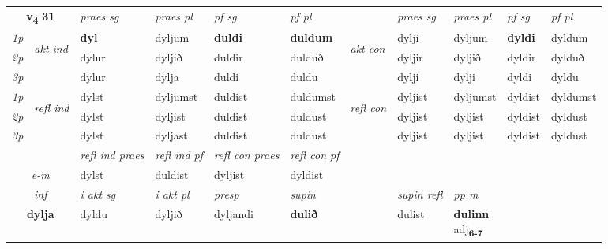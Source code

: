 \noindent
\begin{tabular}{lllllllllll} \toprule
\multicolumn{2}{c}{\textbf{v{\textsubscript{4}}} \Large{\textbf{31}}}  &  \textit{praes sg}  & \textit{praes pl}  &\textit{ pf sg} & \textit{pf pl} &  &  \textit{praes sg}  & \textit{praes pl}  & \textit{pf sg} & \textit{pf pl } \\*
	\cmidrule{3-6} \cmidrule{8-11}
 {\textit{1p}} & \multirow{3}{*}{\begin{turn}{90}\textit{akt ind}\end{turn}} & \textbf{dyl} & dyljum & \textbf{duldi} & \textbf{duldum} & \multirow{3}{*}{\begin{turn}{90}\textit{akt con}\end{turn}} &dylji & dyljum & \textbf{dyldi} & dyldum\\*
 {\textit{2p}} &  &  dylur  & dyljið & duldir & dulduð & & dyljir & dyljið & dyldir & dylduð \\*
{\textit{3p}} &  & dylur & dylja & duldi & duldu & & dylji & dylji& dyldi & dyldu \\*
\cmidrule{3-6} \cmidrule{8-11}
 {\textit{1p}} & \multirow{3}{*}{\begin{turn}{90}\textit{refl ind}\end{turn}}  & dylst & dyljumst & duldist & duldumst & \multirow{3}{*}{\begin{turn}{90}\textit{refl con}\end{turn}}  &dyljist & dyljumst & dyldist & dyldumst \\*
 {\textit{2p}} &  & dylst & dyljist & duldist & duldust & &dyljist & dyljist & dyldist & dyldust \\*
 {\textit{3p}}  & & dylst & dyljast & duldist & duldust & & dyljist & dyljist& dyldist & dyldust \\*
\cmidrule{3-6} \cmidrule{8-11}

 & & \textit{refl ind praes} & \textit{refl ind pf} & \textit{refl con praes} & \textit{refl con pf} \\*
 \multicolumn{2}{c}{ \textit{e-m} }& dylst & duldist & dyljist & dyldist \\*

\cmidrule{3-9}
   \multicolumn{2}{c}{\textit{inf}}  & \textit{i akt sg} & \textit{i akt pl}   & \textit{presp} & \textit{supin} && \textit{supin refl} & \textit{pp m} \\*
  \multicolumn{2}{c}{\textbf{dylja}} & dyldu  & dyljið   & dyljandi &  \textbf{dulið} && dulist & \specialcell{\textbf{dulinn} \\ adj\textbf{\textsubscript{6-7}}} \\*
\end{tabular}

